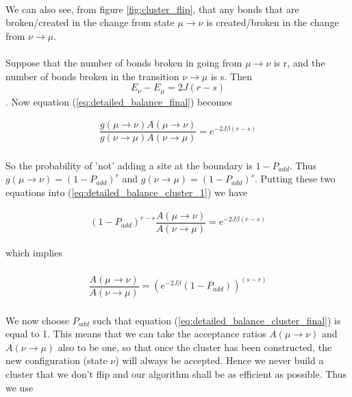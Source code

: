 \documentclass[12pt] {report} %
\begin{document}
				\paragraph{}
					We can also see, from figure \ref{fig:cluster_flip}, that any bonds that are broken/created in the change from state $\mu \rightarrow \nu$ is created/broken in the change from $\nu \rightarrow \mu$. 
					
				\paragraph{}
					Suppose that the number of bonds broken in going from $\mu \rightarrow \nu$ is r, and the number of bonds broken in the transition $\nu \rightarrow \mu$ is s. Then $$E_\nu - E_\mu = 2J(r-s)$$. Now equation (\ref{eq:detailed_balance_final}) becomes
					
				\begin{align}
					\dfrac{g(\mu \rightarrow \nu)A(\mu \rightarrow \nu)}{g(\nu \rightarrow \mu)A(\nu \rightarrow \mu)} =  e^{- 2J \beta (r-s)} \label{eq:detailed_balance_cluster_1}
				\end{align}
				
				\paragraph{}
					So the probability of 'not' adding a site at the boundary is $1-P_{add}$. Thus $g(\mu \rightarrow \nu) = (1-P_{add})^r$ and $g(\nu \rightarrow \mu) = (1-P_{add})^s$. Putting these two equations into (\ref{eq:detailed_balance_cluster_1}) we have
					
				\begin{align}
					(1-P_{add})^{r-s}\dfrac{A(\mu \rightarrow \nu)}{A(\nu \rightarrow \mu)} =  e^{- 2J \beta (r-s)} \label{eq:detailed_balance_cluster_2}
				\end{align}
				
				which implies
				
				\paragraph{}
				
				\begin{align}
					\dfrac{A(\mu \rightarrow \nu)}{A(\nu \rightarrow \mu)} =  (e^{- 2J \beta}(1-P_{add}))^{(s-r)} \label{eq:detailed_balance_cluster_final}
				\end{align}
				
				\paragraph{}
					We now choose $P_{add}$ such that equation (\ref{eq:detailed_balance_cluster_final}) is equal to 1. This means that we can take the acceptance ratios $A(\mu \rightarrow \nu)$ and $A(\nu \rightarrow \mu)$ also to be one, so that once the cluster has been constructed, the new configuration (state $\nu$) will always be accepted. Hence we never build a cluster that we don't flip and our algorithm shall be as efficient as possible. Thus we use
					
\end{document}
